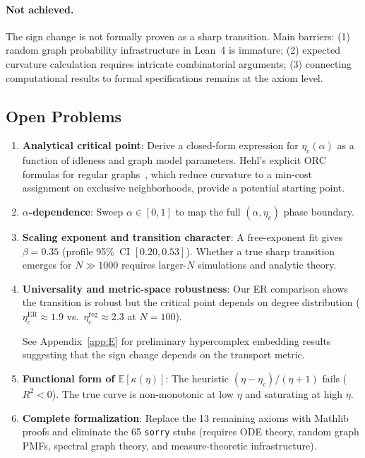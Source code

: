 \documentclass[12pt]{article}
\newcommand{\etac}{\eta_c}
\newcommand{\sorry}{\texttt{sorry}}
\begin{document}
\paragraph{Not achieved.} The sign change is not formally proven as a sharp transition. Main barriers: (1)
random graph probability infrastructure in Lean~4 is immature; (2) expected curvature
calculation requires intricate combinatorial arguments; (3) connecting computational results
to formal specifications remains at the axiom level.

\subsection{Open Problems}
\label{sec:open}

\begin{enumerate}
  \item \textbf{Analytical critical point}: Derive a closed-form expression for
  $\etac(\alpha)$ as a function of idleness and graph model parameters. Hehl's explicit
  ORC formulas for regular graphs~\cite{Hehl2024}, which reduce curvature to a min-cost
  assignment on exclusive neighborhoods, provide a potential starting point.

  \item \textbf{$\alpha$-dependence}: Sweep $\alpha \in [0,1]$ to map the full
  $(\alpha, \etac)$ phase boundary.

  \item \textbf{Scaling exponent and transition character}: A free-exponent fit gives
  $\beta = 0.35$ (profile 95\%~CI $[0.20, 0.53]$). Whether a true sharp transition emerges
  for $N \gg 1000$ requires larger-$N$ simulations and analytic theory.

  \item \textbf{Universality and metric-space robustness}: Our ER comparison shows the
  transition is robust but the critical point depends on degree distribution
  ($\etac^{\mathrm{ER}} \approx 1.9$ vs.\ $\etac^{\mathrm{reg}} \approx 2.3$ at $N=100$).

  See Appendix~\ref{app:E} for preliminary hypercomplex embedding results suggesting that
  the sign change depends on the transport metric.

  \item \textbf{Functional form of $\mathbb{E}[\kappa(\eta)]$}: The heuristic
  $(\eta - \etac)/(\eta + 1)$ fails ($R^2 < 0$). The true curve is non-monotonic at low
  $\eta$ and saturating at high $\eta$.

  \item \textbf{Complete formalization}: Replace the 13 remaining axioms with Mathlib proofs
  and eliminate the 65 \sorry{} stubs (requires ODE theory, random
  graph PMFs, spectral graph theory, and measure-theoretic infrastructure).
\end{enumerate}
\end{document}
